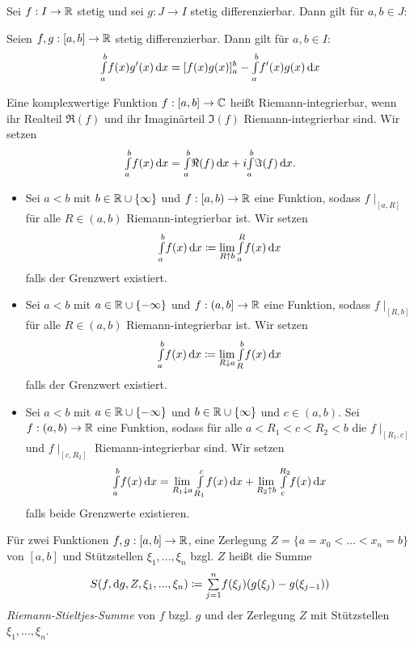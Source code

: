 \documentclass{cheat-sheet}
\begin{document}
\begin{satz}
Sei $f : I \to \mathbb{R}$ stetig und sei $g : J \to I$ stetig differenzierbar. Dann gilt für $a, b \in J$:
\end{satz}

\begin{satz}
Seien $f, g : [a, b] \to \mathbb{R}$ stetig differenzierbar. Dann gilt für $a, b \in I$:
\[ {\textstyle \int\limits_{a}^{b}} f(x)g'(x) \,\mathrm{d} x = [f(x)g(x)]_a^b - {\textstyle \int\limits_{a}^{b}} f'(x)g(x) \,\mathrm{d} x \]
\end{satz}

\begin{defn}
Eine komplexwertige Funktion $f : [a, b] \to \mathbb{C}$ heißt Riemann-integrierbar, wenn ihr Realteil $\Re(f)$ und ihr Imaginärteil $\Im(f)$ Riemann-integrierbar sind. Wir setzen
\[ {\textstyle \int\limits_{a}^{b}} f(x) \,\mathrm{d} x = {\textstyle \int\limits_{a}^{b}} \Re(f) \,\mathrm{d} x + i {\textstyle \int\limits_{a}^{b}} \Im(f) \,\mathrm{d} x. \]
\end{defn}

\begin{defn}
\begin{itemize}
  \item Sei $a < b$ mit $b \in \mathbb{R} \cup \{ \infty \}$ und $f : [a, b) \to \mathbb{R}$ eine Funktion, sodass $f\mid_[a, R]$ für alle $R \in (a, b)$ Riemann-integrierbar ist. Wir setzen
  \[ {\textstyle \int\limits_{a}^{b}} f(x) \,\mathrm{d} x \coloneqq \lim_{R \uparrow b} {\textstyle \int\limits_{a}^{R}} f(x) \,\mathrm{d} x \]
  falls der Grenzwert existiert.
  \item Sei $a < b$ mit $a \in \mathbb{R} \cup \{ -\infty \}$ und $f : (a, b] \to \mathbb{R}$ eine Funktion, sodass $f\mid_[R, b]$ für alle $R \in (a, b)$ Riemann-integrierbar ist. Wir setzen
  \[ {\textstyle \int\limits_{a}^{b}} f(x) \,\mathrm{d} x \coloneqq \lim_{R \downarrow a} {\textstyle \int\limits_{R}^{b}} f(x) \,\mathrm{d} x \]
  falls der Grenzwert existiert.
  \item Sei $a < b$ mit $a \in \mathbb{R} \cup \{ -\infty \}$ und $b \in \mathbb{R} \cup \{ \infty \}$ und $c \in (a, b)$. Sei $f : (a, b) \to \mathbb{R}$ eine Funktion, sodass für alle $a < R_1 < c < R_2 < b$ die $f\mid_{[R_1, c]}$ und $f\mid_{[c, R_2]}$ Riemann-integrierbar sind. Wir setzen
  \[ {\textstyle \int\limits_{a}^{b}} f(x) \,\mathrm{d} x = \lim_{R_1 \downarrow a} {\textstyle \int\limits_{R_1}^{c}} f(x) \,\mathrm{d} x + \lim_{R_2 \uparrow b} {\textstyle \int\limits_{c}^{R_2}} f(x) \,\mathrm{d} x \]
  falls beide Grenzwerte existieren.
\end{itemize}
\end{defn}


\begin{defn}
Für zwei Funktionen $f, g : [a, b] \to \mathbb{R}$, eine Zerlegung $Z = \{ a = x_0 < ... < x_n = b \}$ von $[a, b]$ und Stützstellen $\xi_1, ..., \xi_n$ bzgl. $Z$ heißt die Summe
\[ S(f, \d g, Z, \xi_1, ..., \xi_n) \coloneqq \sum_{j=1}^{n}\!f(\xi_j)(g(\xi_j) - g(\xi_{j-1})) \]
\emph{Riemann-Stieltjes-Summe} von $f$ bzgl. $g$ und der Zerlegung $Z$ mit Stützstellen $\xi_1, ..., \xi_n$.
\end{defn}
\end{document}
